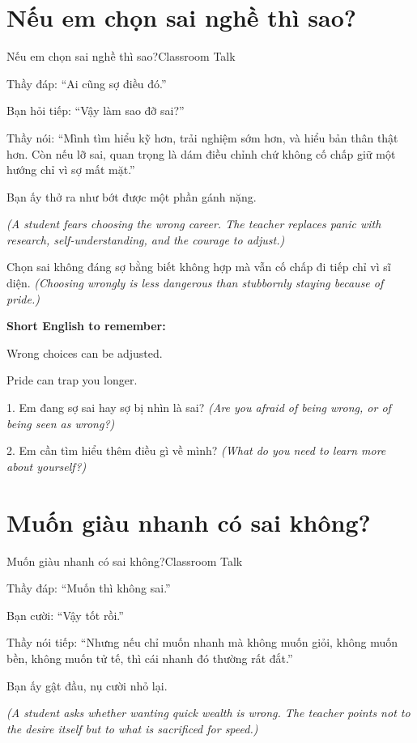 \section{Nếu em chọn sai nghề thì sao?}
\begin{truyen}{Nếu em chọn sai nghề thì sao?}{Classroom Talk}

Thầy đáp: ``Ai cũng sợ điều đó.''

Bạn hỏi tiếp: ``Vậy làm sao đỡ sai?''

Thầy nói: ``Mình tìm hiểu kỹ hơn, trải nghiệm sớm hơn, và hiểu bản thân thật hơn. Còn nếu lỡ sai, quan trọng là dám điều chỉnh chứ không cố chấp giữ một hướng chỉ vì sợ mất mặt.''

Bạn ấy thở ra như bớt được một phần gánh nặng.

\textit{(A student fears choosing the wrong career. The teacher replaces panic with research, self-understanding, and the courage to adjust.)}
\end{truyen}

\begin{baihoc}
Chọn sai không đáng sợ bằng biết không hợp mà vẫn cố chấp đi tiếp chỉ vì sĩ diện.
\textit{(Choosing wrongly is less dangerous than stubbornly staying because of pride.)}
\end{baihoc}

\begin{ghinhoanh}
\textbf{Short English to remember:}

Wrong choices can be adjusted.

Pride can trap you longer.
\end{ghinhoanh}

\begin{tuhocnhanh}
1. Em đang sợ sai hay sợ bị nhìn là sai? \textit{(Are you afraid of being wrong, or of being seen as wrong?)}

2. Em cần tìm hiểu thêm điều gì về mình? \textit{(What do you need to learn more about yourself?)}
\end{tuhocnhanh}
\ngancach

\section{Muốn giàu nhanh có sai không?}
\begin{truyen}{Muốn giàu nhanh có sai không?}{Classroom Talk}

Thầy đáp: ``Muốn thì không sai.''

Bạn cười: ``Vậy tốt rồi.''

Thầy nói tiếp: ``Nhưng nếu chỉ muốn nhanh mà không muốn giỏi, không muốn bền, không muốn tử tế, thì cái nhanh đó thường rất đắt.''

Bạn ấy gật đầu, nụ cười nhỏ lại.

\textit{(A student asks whether wanting quick wealth is wrong. The teacher points not to the desire itself but to what is sacrificed for speed.)}
\end{truyen}


